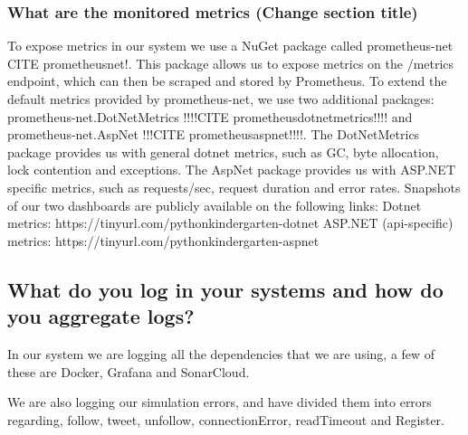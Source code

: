 \subsubsection{What are the monitored metrics (Change section title)}
To expose metrics in our system we use a NuGet package called prometheus-net CITE prometheusnet!.
This package allows us to expose metrics on the /metrics endpoint, which can then be scraped and stored by Prometheus.
\newline
To extend the default metrics provided by prometheus-net, we use two additional packages: 
prometheus-net.DotNetMetrics !!!!CITE prometheusdotnetmetrics!!!! and prometheus-net.AspNet !!!CITE prometheusaspnet!!!!.
\newline
The DotNetMetrics package provides us with general dotnet metrics, such as GC, byte allocation, lock contention and exceptions.
\newline
The AspNet package provides us with ASP.NET specific metrics, such as requests/sec, request duration and error rates.
\newline
\newline
Snapshots of our two dashboards are publicly available on the following links:
\newline
Dotnet metrics: https://tinyurl.com/pythonkindergarten-dotnet
\newline
ASP.NET (api-specific) metrics: https://tinyurl.com/pythonkindergarten-aspnet

\subsection{What do you log in your systems and how do you aggregate logs?}
In our system we are logging all the dependencies that we are using, a few of these are Docker, Grafana and SonarCloud. 

We are also logging our simulation errors, and have divided them into errors regarding, follow, tweet, unfollow, connectionError, readTimeout and Register.


